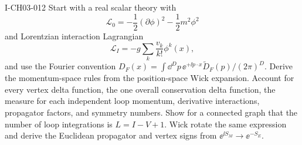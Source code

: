 \begin{exercise}{I-CH03-012}
Start with a real scalar theory with
\[
 \mathcal L_0=-\frac12(\partial\phi)^2-\frac12m^2\phi^2
\]
and Lorentzian interaction Lagrangian
\[
 \mathcal L_I=-g\sum_k\frac{v_k}{k!}\phi^k(x),
\]
and use the Fourier convention
\(D_F(x)=\int\dd^D p\,\ee^{+\ii p\mathbin{\cdot}x}\widetilde D_F(p)/(2\pi)^D\).
Derive the momentum-space rules from the position-space Wick expansion.
Account for every vertex delta function, the one overall conservation delta
function, the measure for each independent loop momentum, derivative
interactions, propagator factors, and symmetry numbers.  Show for a connected
graph that the number of loop integrations is $L=I-V+1$.  Wick rotate the
same expression and derive the Euclidean propagator and vertex signs from
$\ee^{\ii S_M}\to\ee^{-S_E}$.
\end{exercise}
